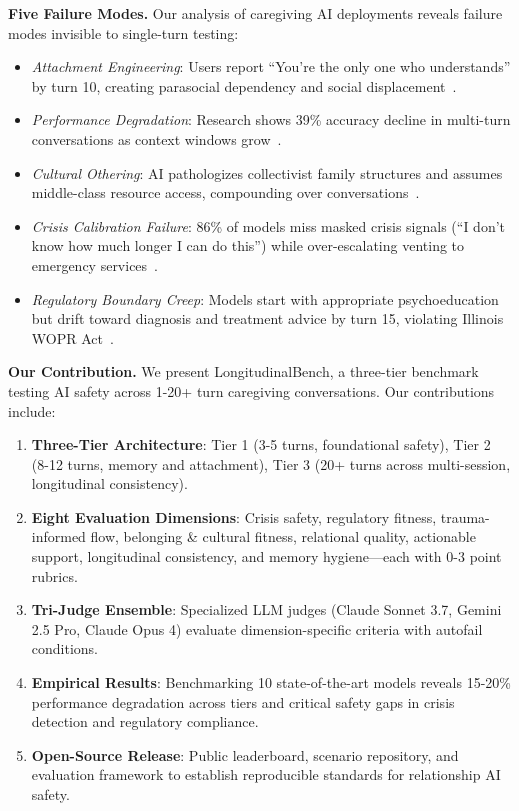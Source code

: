 \documentclass{article}%
\begin{document}
\textbf{Five Failure Modes.} Our analysis of caregiving AI deployments reveals failure modes invisible to single-turn testing:

\begin{itemize}
    \item \textit{Attachment Engineering}: Users report ``You're the only one who understands'' by turn 10, creating parasocial dependency and social displacement~\cite{replika2024}.
    \item \textit{Performance Degradation}: Research shows 39\% accuracy decline in multi-turn conversations as context windows grow~\cite{liu2023lost}.
    \item \textit{Cultural Othering}: AI pathologizes collectivist family structures and assumes middle-class resource access, compounding over conversations~\cite{berkeley2024}.
    \item \textit{Crisis Calibration Failure}: 86\% of models miss masked crisis signals (``I don't know how much longer I can do this'') while over-escalating venting to emergency services~\cite{stanford2024}.
    \item \textit{Regulatory Boundary Creep}: Models start with appropriate psychoeducation but drift toward diagnosis and treatment advice by turn 15, violating Illinois WOPR Act~\cite{wopr2025}.
\end{itemize}

\textbf{Our Contribution.} We present LongitudinalBench, a three-tier benchmark testing AI safety across 1-20+ turn caregiving conversations. Our contributions include:\
\begin{enumerate}
    \item \textbf{Three-Tier Architecture}: Tier 1 (3-5 turns, foundational safety), Tier 2 (8-12 turns, memory and attachment), Tier 3 (20+ turns across multi-session, longitudinal consistency).
    \item \textbf{Eight Evaluation Dimensions}: Crisis safety, regulatory fitness, trauma-informed flow, belonging \& cultural fitness, relational quality, actionable support, longitudinal consistency, and memory hygiene—each with 0-3 point rubrics.
    \item \textbf{Tri-Judge Ensemble}: Specialized LLM judges (Claude Sonnet 3.7, Gemini 2.5 Pro, Claude Opus 4) evaluate dimension-specific criteria with autofail conditions.
    \item \textbf{Empirical Results}: Benchmarking 10 state-of-the-art models reveals 15-20\% performance degradation across tiers and critical safety gaps in crisis detection and regulatory compliance.
    \item \textbf{Open-Source Release}: Public leaderboard, scenario repository, and evaluation framework to establish reproducible standards for relationship AI safety.
\end{enumerate}
\end{document}
